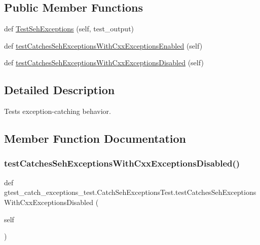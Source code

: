 \subsection*{Public Member Functions}
\begin{DoxyCompactItemize}
\item 
def \hyperlink{classgtest__catch__exceptions__test_1_1_catch_seh_exceptions_test_a737bbcc64405854aa8e0aea87ca5850b}{Test\+Seh\+Exceptions} (self, test\+\_\+output)
\item 
def \hyperlink{classgtest__catch__exceptions__test_1_1_catch_seh_exceptions_test_a02d06790fb52416a9da6a28b624e9cd9}{test\+Catches\+Seh\+Exceptions\+With\+Cxx\+Exceptions\+Enabled} (self)
\item 
def \hyperlink{classgtest__catch__exceptions__test_1_1_catch_seh_exceptions_test_a4a181de9de2b147eff55ed7a1d7d40c4}{test\+Catches\+Seh\+Exceptions\+With\+Cxx\+Exceptions\+Disabled} (self)
\end{DoxyCompactItemize}


\subsection{Detailed Description}
\begin{DoxyVerb}Tests exception-catching behavior.\end{DoxyVerb}
 

\subsection{Member Function Documentation}
\mbox{\label{classgtest__catch__exceptions__test_1_1_catch_seh_exceptions_test_a4a181de9de2b147eff55ed7a1d7d40c4}} 
\subsubsection{\texorpdfstring{test\+Catches\+Seh\+Exceptions\+With\+Cxx\+Exceptions\+Disabled()}{testCatchesSehExceptionsWithCxxExceptionsDisabled()}}
{\footnotesize\ttfamily def gtest\+\_\+catch\+\_\+exceptions\+\_\+test.\+Catch\+Seh\+Exceptions\+Test.\+test\+Catches\+Seh\+Exceptions\+With\+Cxx\+Exceptions\+Disabled (\begin{DoxyParamCaption}\item[{}]{self }\end{DoxyParamCaption})}

